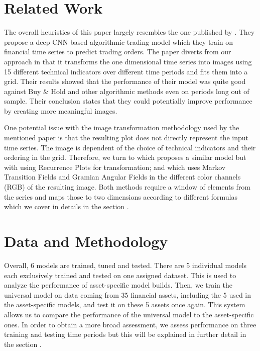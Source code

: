 \documentclass[11pt, a4paper]{article}
\begin{document}
\section{Related Work}
\label{sec:RelWork}

The overall heuristics of this paper largely resembles the one published by \cite{sezer2018algorithmic}. They propose a deep CNN based algorithmic trading model which they train on financial time series to predict trading orders. The paper diverts from our approach in that it transforms the one dimensional time series into images using 15 different technical indicators over different time periods and fits them into a grid. Their results showed that the performance of their model was quite good against Buy \& Hold and other algorithmic methods even on periods long out of sample. Their conclusion states that they could potentially improve performance by creating more meaningful images.

One potential issue with the image transformation methodology used by the mentioned paper is that the resulting plot does not directly represent the input time series. The image is dependent of the choice of technical indicators and their ordering in the grid. Therefore, we turn to \cite{hatami2018classification} which proposes a similar model but with using Recurrence Plots for transformation; and \cite{wang2015encoding} which uses Markov Transition Fields and Gramian Angular Fields in the different color channels (RGB) of the resulting image. Both methods require a window of elements from the series and maps those to two dimensions according to different formulas which we cover in details in the section .

\section{Data and Methodology}
Overall, 6 models are trained, tuned and tested. There are 5 individual models each exclusively trained and tested on one assigned dataset. This is used to analyze the performance of asset-specific model builds. 
Then, we train the universal model on data coming from 35 financial assets, including the 5 used in the asset-specific models, and test it on these 5 assets once again. This system allows us to compare the performance of the universal model to the asset-specific ones. In order to obtain a more broad assessment, we assess performance on three training and testing time periods but this will be explained in further detail in the section .
\end{document}
